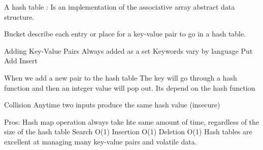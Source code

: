 A hash table : 
  Is an implementation of the associative array abstract data structure.

Bucket 
  describe each entry or place for a key-value pair to go in a hash table.

Adding Key-Value Pairs 
  Always added as a set 
  Keywords vary by language 
    Put 
    Add 
    Insert

When we add a new pair to the hash table
  The key will go through a hash function and then an integer value will pop out. 
  Its depend on the hash function 

Collision
  Anytime two inputs produce the same hash value (insecure)

Pros: 
  Hash map operation always take hte same amount of time, regardless of the size of the hash table 
  Search O(1)
  Insertion O(1)
  Deletion O(1) 
  Hash tables are excellent at managing many key-value pairs and volatile data.
